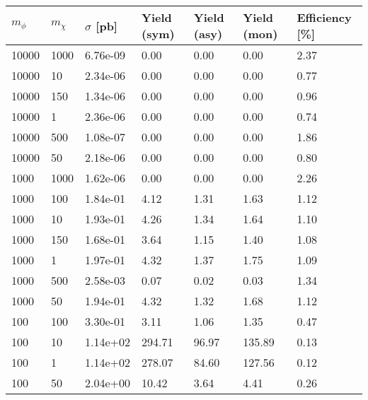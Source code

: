 \begin{table}
\renewcommand{\arraystretch}{1.0}
\footnotesize
\centering
\begin{tabular}{lllllll}
\hline
$m_\phi$ & $m_\chi$ & $\sigma$ [pb] & Yield (sym) & Yield (asy) & Yield (mon) & Efficiency [\%] \\ \hline
10000     &   1000      &   6.76e-09  &   0.00      &   0.00      &   0.00      &   2.37      \\ 
10000     &   10        &   2.34e-06  &   0.00      &   0.00      &   0.00      &   0.77      \\ 
10000     &   150       &   1.34e-06  &   0.00      &   0.00      &   0.00      &   0.96      \\ 
10000     &   1         &   2.36e-06  &   0.00      &   0.00      &   0.00      &   0.74      \\ 
10000     &   500       &   1.08e-07  &   0.00      &   0.00      &   0.00      &   1.86      \\ 
10000     &   50        &   2.18e-06  &   0.00      &   0.00      &   0.00      &   0.80      \\ 
1000      &   1000      &   1.62e-06  &   0.00      &   0.00      &   0.00      &   2.26      \\ 
1000      &   100       &   1.84e-01  &   4.12      &   1.31      &   1.63      &   1.12      \\ 
1000      &   10        &   1.93e-01  &   4.26      &   1.34      &   1.64      &   1.10      \\ 
1000      &   150       &   1.68e-01  &   3.64      &   1.15      &   1.40      &   1.08      \\ 
1000      &   1         &   1.97e-01  &   4.32      &   1.37      &   1.75      &   1.09      \\ 
1000      &   500       &   2.58e-03  &   0.07      &   0.02      &   0.03      &   1.34      \\ 
1000      &   50        &   1.94e-01  &   4.32      &   1.32      &   1.68      &   1.12      \\ 
100       &   100       &   3.30e-01  &   3.11      &   1.06      &   1.35      &   0.47      \\ 
100       &   10        &   1.14e+02  &   294.71    &   96.97     &   135.89    &   0.13      \\ 
100       &   1         &   1.14e+02  &   278.07    &   84.60     &   127.56    &   0.12      \\ 
100       &   50        &   2.04e+00  &   10.42     &   3.64      &   4.41      &   0.26      \\ 

\end{tabular}
\end{table}

